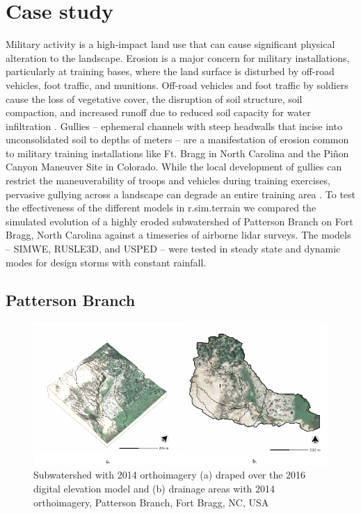 \documentclass[gmd, manuscript]{copernicus}
\begin{document}

\section{Case study} 

Military activity is a high-impact land use 
that can cause significant physical alteration to the landscape. 
Erosion is a major concern for military installations, 
particularly at training bases, 
where the land surface is disturbed by 
off-road vehicles, foot traffic, and munitions. 
Off-road vehicles and foot traffic by soldiers 
cause the loss of vegetative cover, 
the disruption of soil structure, soil compaction, 
and increased runoff due to 
reduced soil capacity for water infiltration 
\citep{Webb1983, McDonald2004}.
Gullies -- ephemeral channels with steep headwalls 
that incise into unconsolidated soil to depths of meters -- 
are a manifestation of erosion common to 
military training installations like Ft. Bragg in North Carolina 
and the Pi\~{n}on Canyon Maneuver Site in Colorado. 
While the local development of gullies can restrict 
the maneuverability of troops and vehicles during training exercises, 
pervasive gullying across a landscape 
can degrade an entire training area 
\citep{Huang2014}.
%
To test the effectiveness of the different models 
in r.sim.terrain
we compared the simulated evolution
of a highly eroded subwatershed 
of Patterson Branch on Fort Bragg, North Carolina
against a timeseries of airborne lidar surveys.
The models -- SIMWE, RUSLE3D, and USPED --
were tested in steady state and dynamic modes
for design storms with constant rainfall.

\subsection{Patterson Branch}

\begin{figure}
\center
\includegraphics[width=\textwidth,height=0.95\textheight,keepaspectratio]{figures/watershed.pdf}
\caption{Subwatershed with 2014 orthoimagery
(a) draped over the 2016 digital elevation model
and (b) drainage areas with 2014 orthoimagery, Patterson Branch, Fort Bragg, NC, USA}
\label{fig:watershed}
\end{figure}
\end{document}

